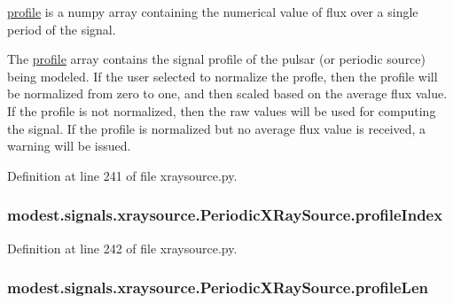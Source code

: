 \hyperlink{classmodest_1_1signals_1_1xraysource_1_1PeriodicXRaySource_a50e061bb97d0dd6ab7f344370c6b35a4}{profile} is a numpy array containing the numerical value of flux over a single period of the signal. 

The \hyperlink{classmodest_1_1signals_1_1xraysource_1_1PeriodicXRaySource_a50e061bb97d0dd6ab7f344370c6b35a4}{profile} array contains the signal profile of the pulsar (or periodic source) being modeled. If the user selected to normalize the profle, then the profile will be normalized from zero to one, and then scaled based on the average flux value. If the profile is not normalized, then the raw values will be used for computing the signal. If the profile is normalized but no average flux value is received, a warning will be issued. 

Definition at line 241 of file xraysource.\+py.

\subsubsection[{\texorpdfstring{profile\+Index}{profileIndex}}]{\setlength{\rightskip}{0pt plus 5cm}modest.\+signals.\+xraysource.\+Periodic\+X\+Ray\+Source.\+profile\+Index}\hypertarget{classmodest_1_1signals_1_1xraysource_1_1PeriodicXRaySource_aaf45141c09e1fd35c80c49907fa44497}{}\label{classmodest_1_1signals_1_1xraysource_1_1PeriodicXRaySource_aaf45141c09e1fd35c80c49907fa44497}


Definition at line 242 of file xraysource.\+py.

\subsubsection[{\texorpdfstring{profile\+Len}{profileLen}}]{\setlength{\rightskip}{0pt plus 5cm}modest.\+signals.\+xraysource.\+Periodic\+X\+Ray\+Source.\+profile\+Len}\hypertarget{classmodest_1_1signals_1_1xraysource_1_1PeriodicXRaySource_a9d4e5488915741b792df74c256782777}{}\label{classmodest_1_1signals_1_1xraysource_1_1PeriodicXRaySource_a9d4e5488915741b792df74c256782777}



